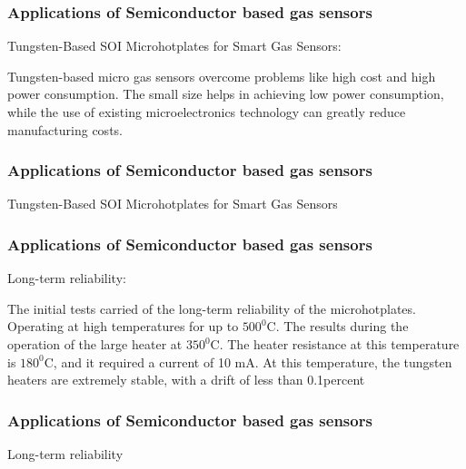 \documentclass{beamer}
\begin{document}
\begin{frame}
\frametitle{Applications of Semiconductor based gas sensors}Tungsten-Based SOI Microhotplates for Smart Gas Sensors:\newline

Tungsten-based micro gas sensors overcome problems like high cost and high power consumption.\newline
The small size helps in achieving low power consumption, while the use of existing microelectronics technology can greatly reduce manufacturing costs.
\end{frame}

\begin{frame}
\frametitle{Applications of Semiconductor based gas sensors}Tungsten-Based SOI Microhotplates for Smart Gas Sensors
\end{frame}

\begin{frame}
\frametitle{Applications of Semiconductor based gas sensors}Long-term reliability:\newline

The initial tests carried of the long-term reliability of the microhotplates.\newline
Operating at high temperatures for up to $500^{0}$C.\newline
The results during the operation of the large heater at $350^{0}$C.\newline
The heater  resistance at this temperature is $180^{0}$C, and it required a current of 10 mA.\newline
At this temperature, the tungsten heaters are extremely stable, with a drift of less than 0.1percent

\end{frame}

\begin{frame}
\frametitle{Applications of Semiconductor based gas sensors}Long-term reliability
\end{frame}
\end{document}
